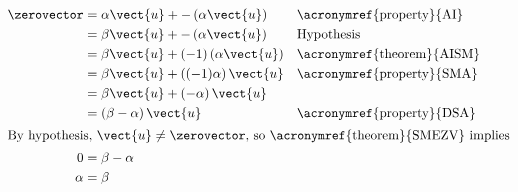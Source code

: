 \begin{align*}
\zerovector
&=\alpha\vect{u} + -\left(\alpha\vect{u}\right)&&\text{\acronymref{property}{AI}}\\
&=\beta\vect{u} + -\left(\alpha\vect{u}\right)&&\text{Hypothesis}\\
&=\beta\vect{u} + (-1)\left(\alpha\vect{u}\right)&&\text{\acronymref{theorem}{AISM}}\\
&=\beta\vect{u} + \left((-1)\alpha\right)\vect{u}&&\text{\acronymref{property}{SMA}}\\
&=\beta\vect{u} + \left(-\alpha\right)\vect{u}\\
&=\left(\beta-\alpha\right)\vect{u}&&\text{\acronymref{property}{DSA}}\\
\intertext{By hypothesis, $\vect{u}\neq\zerovector$, so \acronymref{theorem}{SMEZV} implies}
0&=\beta-\alpha\\
\alpha&=\beta
\end{align*}
